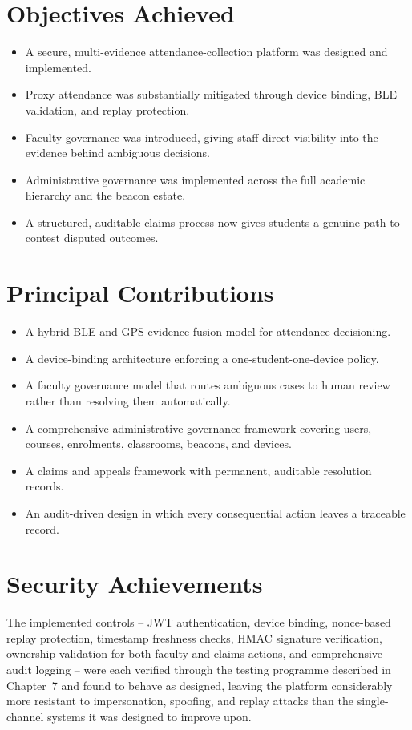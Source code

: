 \documentclass[12pt, a4paper, oneside]{report}
\begin{document}
\section{Objectives Achieved}
\begin{itemize}
    \item A secure, multi-evidence attendance-collection platform was designed and implemented.
    \item Proxy attendance was substantially mitigated through device binding, BLE validation, and replay protection.
    \item Faculty governance was introduced, giving staff direct visibility into the evidence behind ambiguous decisions.
    \item Administrative governance was implemented across the full academic hierarchy and the beacon estate.
    \item A structured, auditable claims process now gives students a genuine path to contest disputed outcomes.
\end{itemize}

\section{Principal Contributions}
\begin{itemize}
    \item A hybrid BLE-and-GPS evidence-fusion model for attendance decisioning.
    \item A device-binding architecture enforcing a one-student-one-device policy.
    \item A faculty governance model that routes ambiguous cases to human review rather than resolving them automatically.
    \item A comprehensive administrative governance framework covering users, courses, enrolments, classrooms, beacons, and devices.
    \item A claims and appeals framework with permanent, auditable resolution records.
    \item An audit-driven design in which every consequential action leaves a traceable record.
\end{itemize}

\section{Security Achievements}

The implemented controls -- JWT authentication, device binding, nonce-based replay protection, timestamp freshness checks, HMAC signature verification, ownership validation for both faculty and claims actions, and comprehensive audit logging -- were each verified through the testing programme described in Chapter~7 and found to behave as designed, leaving the platform considerably more resistant to impersonation, spoofing, and replay attacks than the single-channel systems it was designed to improve upon.
\end{document}
